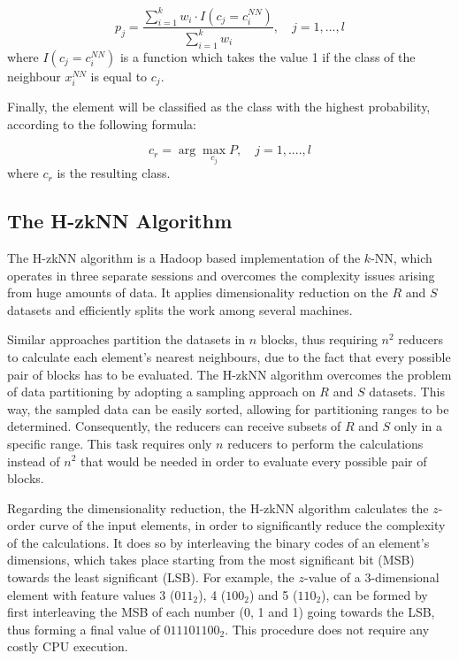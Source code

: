 \begin{equation} \label{eq:2}
	p_{j} = \frac{\sum_{i=1}^{k} w_{i} \cdot I(c_{j} = c_{i}^{NN})}{\sum_{i=1}^{k} w_{i}}, \quad j=1, ..., l
\end{equation}
where $I(c_{j} = c_{i}^{NN})$ is a function which takes the value 1 if the class of the neighbour $x_{i}^{NN}$ is equal to $c_{j}$. 

Finally, the element will be classified as the class with the highest probability, according to the following formula:

\begin{equation} \label{eq:3}
	c_{r} = \arg \max_{c_{j}} P, \quad j=1, ...., l
\end{equation}
where $c_{r}$ is the resulting class.

\subsection{The H-zkNN Algorithm}
\label{subsec:hzknn}
The H-zkNN algorithm is a Hadoop based implementation of the $k$-NN, which operates in three separate sessions and overcomes the complexity issues arising from huge amounts of data. It applies dimensionality reduction on the $R$ and $S$ datasets and efficiently splits the work among several machines. 

Similar approaches partition the datasets in $n$ blocks, thus requiring $n^2$ reducers to calculate each element's nearest neighbours, due to the fact that every possible pair of blocks has to be evaluated. The H-zkNN algorithm overcomes the problem of data partitioning by adopting a sampling approach on $R$ and $S$ datasets. This way, the sampled data can be easily sorted, allowing for partitioning ranges to be determined. Consequently, the reducers can receive subsets of $R$ and $S$ only in a specific range. This task requires only $n$ reducers to perform the calculations instead of $n^2$ that would be needed in order to evaluate every possible pair of blocks. 

Regarding the dimensionality reduction, the H-zkNN algorithm calculates the $z$-order curve of the input elements, in order to significantly reduce the complexity of the calculations. It does so by interleaving the binary codes of an element's dimensions, which takes place starting from the most significant bit (MSB) towards the least significant (LSB). For example, the $z$-value of a 3-dimensional element with feature values 3 ($011_2$), 4 ($100_2$) and 5 ($110_2$), can be formed by first interleaving the MSB of each number (0, 1 and 1) going towards the LSB, thus forming a final value of $011101100_2$. This procedure does not require any costly CPU execution. 

